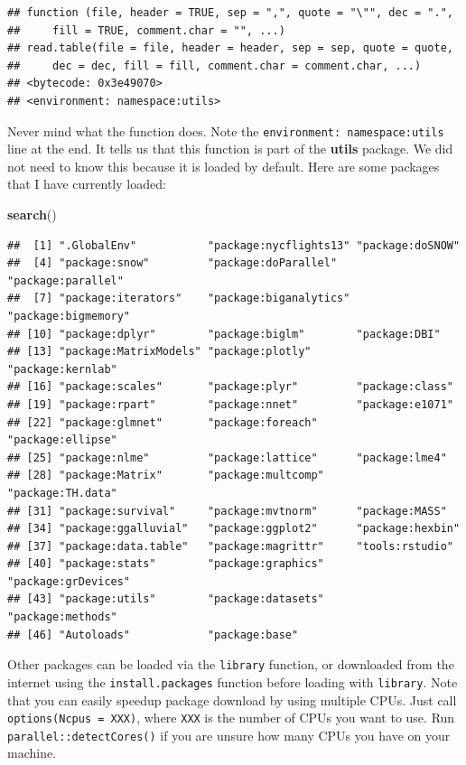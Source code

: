 \documentclass[]{book}
\newenvironment{Shaded}{\begin{snugshade}}{\end{snugshade}}
\newcommand{\KeywordTok}[1]{\textcolor[rgb]{0.13,0.29,0.53}{\textbf{#1}}}
\newcommand{\NormalTok}[1]{#1}
\theoremstyle{definition}
\theoremstyle{definition}
\theoremstyle{definition}
\theoremstyle{remark}
\begin{document}
\begin{verbatim}
## function (file, header = TRUE, sep = ",", quote = "\"", dec = ".", 
##     fill = TRUE, comment.char = "", ...) 
## read.table(file = file, header = header, sep = sep, quote = quote, 
##     dec = dec, fill = fill, comment.char = comment.char, ...)
## <bytecode: 0x3e49070>
## <environment: namespace:utils>
\end{verbatim}

Never mind what the function does. Note the
\texttt{environment:\ namespace:utils} line at the end. It tells us that
this function is part of the \textbf{utils} package. We did not need to
know this because it is loaded by default. Here are some packages that I
have currently loaded:

\begin{Shaded}
\begin{Highlighting}[]
\KeywordTok{search}\NormalTok{()}
\end{Highlighting}
\end{Shaded}

\begin{verbatim}
##  [1] ".GlobalEnv"           "package:nycflights13" "package:doSNOW"      
##  [4] "package:snow"         "package:doParallel"   "package:parallel"    
##  [7] "package:iterators"    "package:biganalytics" "package:bigmemory"   
## [10] "package:dplyr"        "package:biglm"        "package:DBI"         
## [13] "package:MatrixModels" "package:plotly"       "package:kernlab"     
## [16] "package:scales"       "package:plyr"         "package:class"       
## [19] "package:rpart"        "package:nnet"         "package:e1071"       
## [22] "package:glmnet"       "package:foreach"      "package:ellipse"     
## [25] "package:nlme"         "package:lattice"      "package:lme4"        
## [28] "package:Matrix"       "package:multcomp"     "package:TH.data"     
## [31] "package:survival"     "package:mvtnorm"      "package:MASS"        
## [34] "package:ggalluvial"   "package:ggplot2"      "package:hexbin"      
## [37] "package:data.table"   "package:magrittr"     "tools:rstudio"       
## [40] "package:stats"        "package:graphics"     "package:grDevices"   
## [43] "package:utils"        "package:datasets"     "package:methods"     
## [46] "Autoloads"            "package:base"
\end{verbatim}

Other packages can be loaded via the \texttt{library} function, or
downloaded from the internet using the \texttt{install.packages}
function before loading with \texttt{library}. Note that you can easily
speedup package download by using multiple CPUs. Just call
\texttt{options(Ncpus\ =\ XXX)}, where \texttt{XXX} is the number of
CPUs you want to use. Run \texttt{parallel::detectCores()} if you are
unsure how many CPUs you have on your machine.
\end{document}
